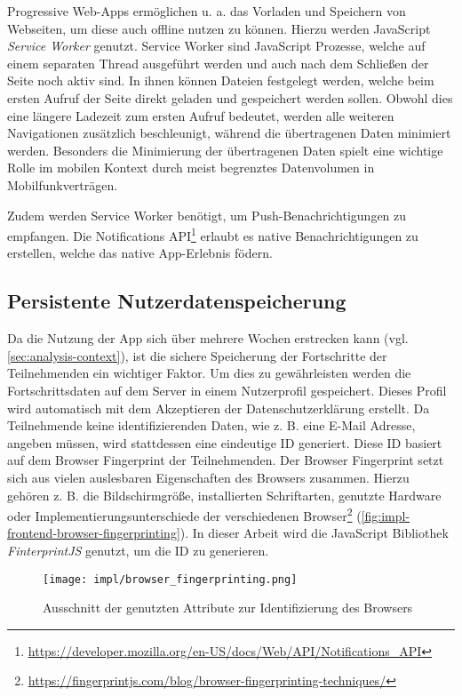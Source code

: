 Progressive Web-Apps ermöglichen u. a. das Vorladen und Speichern von Webseiten,
um diese auch offline nutzen zu können. Hierzu werden JavaScript \textit{Service
Worker} genutzt. Service Worker sind JavaScript Prozesse, welche auf einem
separaten Thread ausgeführt werden und auch nach dem Schließen der Seite noch
aktiv sind. In ihnen können Dateien festgelegt werden, welche beim ersten Aufruf
der Seite direkt geladen und gespeichert werden sollen. Obwohl dies eine längere
Ladezeit zum ersten Aufruf bedeutet, werden alle weiteren Navigationen
zusätzlich beschleunigt, während die übertragenen Daten minimiert werden.
Besonders die Minimierung der übertragenen Daten spielt eine wichtige Rolle im
mobilen Kontext durch meist begrenztes Datenvolumen in Mobilfunkverträgen.

Zudem werden Service Worker benötigt, um Push-Benachrichtigungen zu empfangen.
Die Notifications
API\footnote{\url{https://developer.mozilla.org/en-US/docs/Web/API/Notifications_API}}
erlaubt es native Benachrichtigungen zu erstellen, welche das native
App-Erlebnis födern.

\subsection{Persistente Nutzerdatenspeicherung}

Da die Nutzung der App sich über mehrere Wochen erstrecken kann (vgl.
\autoref{sec:analysis-context}), ist die sichere Speicherung der Fortschritte
der Teilnehmenden ein wichtiger Faktor. Um dies zu gewährleisten werden die
Fortschrittsdaten auf dem Server in einem Nutzerprofil gespeichert. Dieses
Profil wird automatisch mit dem Akzeptieren der Datenschutzerklärung erstellt.
Da Teilnehmende keine identifizierenden Daten, wie z. B. eine E-Mail Adresse,
angeben müssen, wird stattdessen eine eindeutige ID generiert. Diese ID basiert
auf dem Browser Fingerprint der Teilnehmenden. Der Browser Fingerprint setzt
sich aus vielen auslesbaren Eigenschaften des Browsers zusammen. Hierzu gehören
z. B. die Bildschirmgröße, installierten Schriftarten, genutzte Hardware oder
Implementierungsunterschiede der verschiedenen
Browser\footnote{\url{https://fingerprintjs.com/blog/browser-fingerprinting-techniques/}}
(\autoref{fig:impl-frontend-browser-fingerprinting}). In dieser Arbeit wird
die JavaScript Bibliothek \textit{FinterprintJS} \cite{FingerprintJS2022}
genutzt, um die ID zu generieren.

\begin{figure}[htpb]
    \centering
    \texttt{[image: impl/browser\_fingerprinting.png]}
    \caption{Ausschnitt der genutzten Attribute zur Identifizierung des Browsers
    \cite{FingerprintJS2022}}
    \label{fig:impl-frontend-browser-fingerprinting}
\end{figure}

